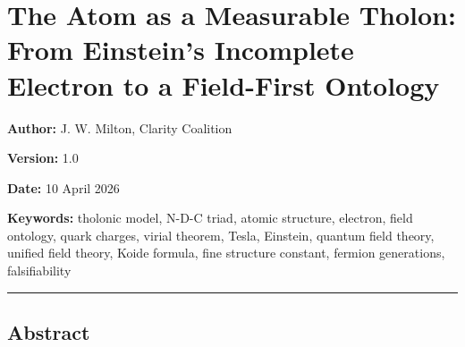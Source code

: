 \documentclass[
  11pt,
  letterpaper,
]{article}
\author{}
\date{}
\begin{document}
\section{The Atom as a Measurable Tholon: From Einstein's Incomplete
Electron to a Field-First
Ontology}\label{the-atom-as-a-measurable-tholon-from-einsteins-incomplete-electron-to-a-field-first-ontology}

\textbf{Author:} J. W. Milton, Clarity Coalition

\textbf{Version:} 1.0

\textbf{Date:} 10 April 2026

\textbf{Keywords:} tholonic model, N-D-C triad, atomic structure,
electron, field ontology, quark charges, virial theorem, Tesla,
Einstein, quantum field theory, unified field theory, Koide formula,
fine structure constant, fermion generations, falsifiability

\begin{center}\rule{0.5\linewidth}{0.5pt}\end{center}

\subsection{Abstract}\label{abstract}
\end{document}
